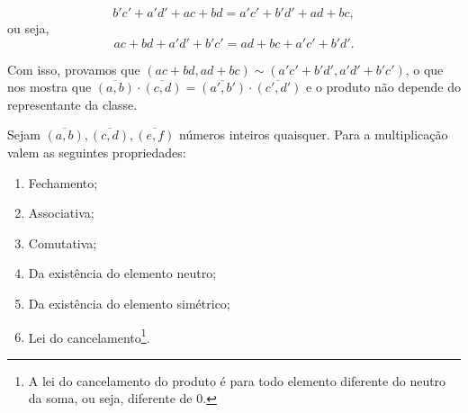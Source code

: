 \documentclass[../main.tex]{subfiles}
\begin{document}
\begin{dem}
    \[ b'c' +a'd' + ac + bd  = a'c' + b'd' + ad+ bc, \]
    ou seja,
    \[ ac + bd + a'd' + b'c' = ad + bc + a'c' + b'd'. \]
    
    Com isso, provamos que $ (ac+bd,ad+bc) \sim (a'c'+b'd',a'd'+b'c')$, o que nos mostra que $\overline{(a,b)} \cdot \overline{(c,d)} = 
    \overline{(a',b')} \cdot \overline{(c',d')}$ e o produto não depende do representante da classe.
\end{dem}
\begin{teo}\label{int-teo-produtoPropriedades}
    Sejam $\overline{(a,b)}, \overline{(c,d)}, \overline{(e,f)}$ números inteiros quaisquer. Para a multiplicação valem as seguintes propriedades:
    \begin{enumerate}[label=(\roman*)]
        \item Fechamento;
        \item Associativa;
        \item Comutativa;
        \item Da existência do elemento neutro; 
        \item Da existência do elemento simétrico;
        \item Lei do cancelamento\footnote{A lei do cancelamento do produto é para todo elemento diferente do neutro da soma, ou seja, diferente de $0$.}.
    \end{enumerate}
\end{teo}
\end{document}
